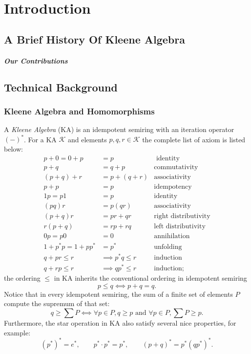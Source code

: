 \chapter{Introduction}
\label{chapter:introduction}
\thispagestyle{myheadings}

\section{A Brief History Of Kleene Algebra}
\label{sec:history}


\paragraph{Our Contributions}

\section{Technical Background}

\subsection{Kleene Algebra and Homomorphisms}

A \emph{Kleene Algebra} (KA) is an idempotent semiring with an iteration operator \((-)^*\).
For a KA \(𝒦\) and elements \(p, q, r ∈ 𝒦\) the complete list of axiom is listed below:
\begin{align*}
  p + 0 = 0 + p & = p & \text{ identity} \\
  p + q &= q + p & \text{commutativity}\\
  (p + q) + r & = p + (q + r) & \text{associativity} \\
  p + p & = p & \text{idempotency} \\
  1 p = p 1 & = p & \text{identity} \\
  (p  q)  r & = p  (q  r) & \text{associativity}\\
  (p + q) r & = pr + qr & \text{right distributivity} \\
  r (p + q) & = rp + rq & \text{left distributivity} \\
  0 p = p 0 & = 0 & \text{annihilation} \\
  1 + p^* p = 1 + p p^* & = p^* 
  & \text{unfolding} \\
  q + pr ≤ r & ⟹ p^* q ≤ r & 
  \text{induction} \\
  q + rp ≤ r & ⟹ qp^* ≤ r & 
  \text{induction};
\end{align*} 
the ordering \(≤\) in KA inherits the conventional ordering in idempotent semiring
\[ p ≤ q ⟺ p + q = q.\]
Notice that in every idempotent semiring, 
the sum of a finite set of elements \(P\) compute the supremum of that set:
\[q ≥ ∑ P ⟺ ∀ p ∈ P, q ≥ p \text{ and } ∀ p ∈ P, ∑ P ≥ p.\]
Furthermore, the star operation in KA also satisfy several nice properties, for example:
\[(p^*)^* = e^*, \qquad p^* ⋅ p^* = p^*, \qquad (p + q)^* = p^*(q p^*)^*.\]

